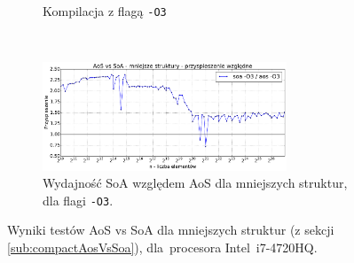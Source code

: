 \begin{figure}
\begin{subfigure}[c]{0.45\textwidth}
        \caption{Kompilacja z flagą \texttt{-O3}}
    \end{subfigure}
     \\
     \vspace{0.55cm}
     \begin{subfigure}[c]{1.0\textwidth}
         \centering
         \includegraphics[width=0.80\textwidth]{images/benchs/compact_aos_vs_soa_normalized}
         \caption{Wydajność SoA względem AoS dla mniejszych struktur, dla flagi \texttt{-O3}.}
         \label{fig:compactAosVsSoaRelative}
        \end{subfigure}
    \caption{Wyniki testów AoS vs SoA dla mniejszych struktur (z sekcji \ref{sub:compactAosVsSoa}), dla~procesora \mbox{Intel i7-4720HQ}.}
    \label{fig:compactAosLayout}
\end{figure}

